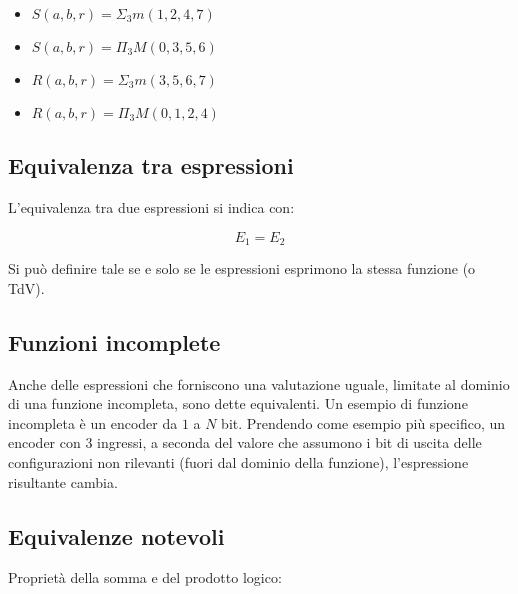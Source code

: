 \documentclass{article}
\begin{document}
\begin{itemize}
    \item $S(a,b,r) = \Sigma_3 m(1,2,4,7)$
    \item $S(a,b,r) = \Pi_3 M(0,3,5,6)$
    \item $R(a,b,r) = \Sigma_3 m(3,5,6,7)$
    \item $R(a,b,r) = \Pi_3 M(0,1,2,4)$
\end{itemize}

\subsection{Equivalenza tra espressioni}

L'equivalenza tra due espressioni si indica con:

$$
E_1 = E_2
$$

\noindent
Si può definire tale se e solo se le espressioni esprimono la stessa funzione (o TdV).

\subsection{Funzioni incomplete}

Anche delle espressioni che forniscono una valutazione uguale, limitate al dominio di una funzione incompleta, sono dette equivalenti.
Un esempio di funzione incompleta è un encoder da $1$ a $N$ bit.
Prendendo come esempio più specifico, un encoder con 3 ingressi, a seconda del valore che assumono i bit di uscita delle configurazioni non rilevanti (fuori dal dominio della funzione), l'espressione risultante cambia.

\subsection{Equivalenze notevoli}

Proprietà della somma e del prodotto logico:
\end{document}
